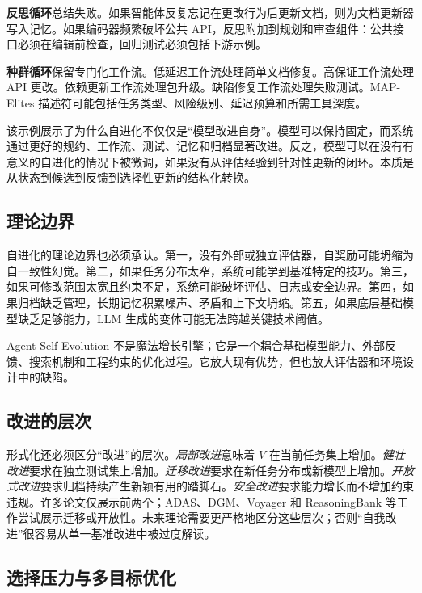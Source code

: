 \textbf{反思循环}总结失败。如果智能体反复忘记在更改行为后更新文档，则为文档更新器写入记忆。如果编码器频繁破坏公共 API，反思附加到规划和审查组件：公共接口必须在编辑前检查，回归测试必须包括下游示例。

\textbf{种群循环}保留专门化工作流。低延迟工作流处理简单文档修复。高保证工作流处理 API 更改。依赖更新工作流处理包升级。缺陷修复工作流处理失败测试。MAP-Elites 描述符可能包括任务类型、风险级别、延迟预算和所需工具深度。

该示例展示了为什么自进化不仅仅是``模型改进自身''。模型可以保持固定，而系统通过更好的规约、工作流、测试、记忆和归档显著改进。反之，模型可以在没有有意义的自进化的情况下被微调，如果没有从评估经验到针对性更新的闭环。本质是从状态到候选到反馈到选择性更新的结构化转换。

\subsection{理论边界}\label{sec:ch2-theory-boundaries}

自进化的理论边界也必须承认。第一，没有外部或独立评估器，自奖励可能坍缩为自一致性幻觉。第二，如果任务分布太窄，系统可能学到基准特定的技巧。第三，如果可修改范围太宽且约束不足，系统可能破坏评估、日志或安全边界。第四，如果归档缺乏管理，长期记忆积累噪声、矛盾和上下文坍缩。第五，如果底层基础模型缺乏足够能力，LLM 生成的变体可能无法跨越关键技术阈值。

Agent Self-Evolution 不是魔法增长引擎；它是一个耦合基础模型能力、外部反馈、搜索机制和工程约束的优化过程。它放大现有优势，但也放大评估器和环境设计中的缺陷。

\subsection{改进的层次}

形式化还必须区分``改进''的层次。\emph{局部改进}意味着 $V$ 在当前任务集上增加。\emph{健壮改进}要求在独立测试集上增加。\emph{迁移改进}要求在新任务分布或新模型上增加。\emph{开放式改进}要求归档持续产生新颖有用的踏脚石。\emph{安全改进}要求能力增长而不增加约束违规。许多论文仅展示前两个；ADAS、DGM、Voyager 和 ReasoningBank 等工作尝试展示迁移或开放性。未来理论需要更严格地区分这些层次；否则``自我改进''很容易从单一基准改进中被过度解读。

\subsection{选择压力与多目标优化}\label{sec:ch2-selection-pressure}

